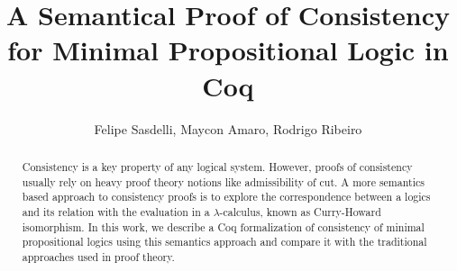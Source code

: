 \documentclass[12pt]{article}
\title{A Semantical Proof of Consistency\\ for Minimal Propositional Logic in Coq}
\author{Felipe Sasdelli\inst{1}, Maycon Amaro\inst{1}, Rodrigo Ribeiro\inst{1}}
\begin{document}
 

\maketitle

\begin{abstract}
  Consistency is a key property of any logical system. However, proofs of
  consistency usually rely on heavy proof theory notions like admissibility
  of cut. A more semantics based approach to consistency proofs is to explore the
  correspondence between a logics and its relation with the
  evaluation in a $\lambda$-calculus, known as Curry-Howard isomorphism.
  In this work, we describe a Coq formalization of consistency of minimal
  propositional logics using this semantics approach and compare it with 
  the traditional approaches used in proof theory.
\end{abstract}






\end{document}
